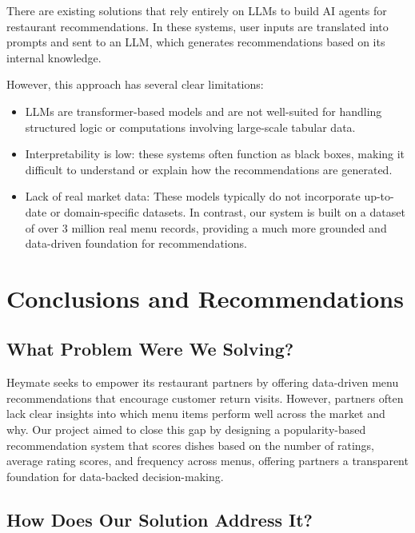 \documentclass[
  11pt,
  a4paper,
  DIV=11,
  numbers=noendperiod]{scrartcl}
\providecommand{\tightlist}{%
  \setlength{\itemsep}{0pt}\setlength{\parskip}{0pt}}\usepackage{longtable,booktabs,array}
\begin{document}
There are existing solutions that rely entirely on LLMs to build AI
agents for restaurant recommendations. In these systems, user inputs are
translated into prompts and sent to an LLM, which generates
recommendations based on its internal knowledge.

However, this approach has several clear limitations:

\begin{itemize}
\tightlist
\item
  LLMs are transformer-based models and are not well-suited for handling
  structured logic or computations involving large-scale tabular data.
\item
  Interpretability is low: these systems often function as black boxes,
  making it difficult to understand or explain how the recommendations
  are generated.
\item
  Lack of real market data: These models typically do not incorporate
  up-to-date or domain-specific datasets. In contrast, our system is
  built on a dataset of over 3 million real menu records, providing a
  much more grounded and data-driven foundation for recommendations.
\end{itemize}

\section{Conclusions and
Recommendations}\label{conclusions-and-recommendations}

\subsection{What Problem Were We
Solving?}\label{what-problem-were-we-solving}

Heymate seeks to empower its restaurant partners by offering data-driven
menu recommendations that encourage customer return visits. However,
partners often lack clear insights into which menu items perform well
across the market and why. Our project aimed to close this gap by
designing a popularity-based recommendation system that scores dishes
based on the number of ratings, average rating scores, and frequency
across menus, offering partners a transparent foundation for data-backed
decision-making.

\subsection{How Does Our Solution Address
It?}\label{how-does-our-solution-address-it}
\end{document}
